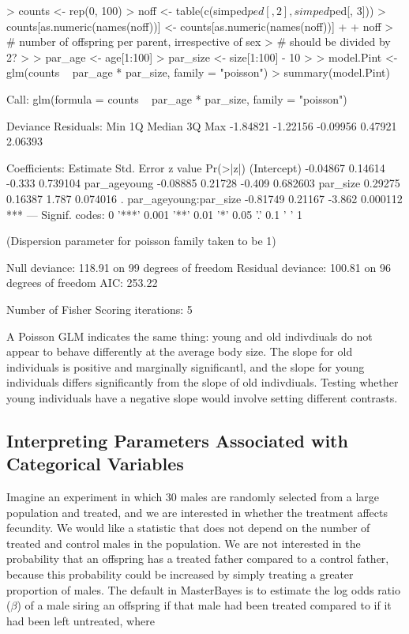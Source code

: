 \documentclass{article}
\begin{document}
\begin{Schunk}
\begin{Sinput}
> counts <- rep(0, 100)
> noff <- table(c(simped$ped[, 2], simped$ped[, 3]))
> counts[as.numeric(names(noff))] <- counts[as.numeric(names(noff))] + 
+     noff
> # number of offspring per parent, irrespective of sex
> # should be divided by 2?
>
> par_age <- age[1:100]
> par_size <- size[1:100] - 10
>
> model.Pint <- glm(counts ~ par_age * par_size, family = "poisson")
> summary(model.Pint)
\end{Sinput}
\begin{Soutput}
Call:
glm(formula = counts ~ par_age * par_size, family = "poisson")

Deviance Residuals: 
     Min        1Q    Median        3Q       Max  
-1.84821  -1.22156  -0.09956   0.47921   2.06393  

Coefficients:
                      Estimate Std. Error z value Pr(>|z|)    
(Intercept)           -0.04867    0.14614  -0.333 0.739104    
par_ageyoung          -0.08885    0.21728  -0.409 0.682603    
par_size               0.29275    0.16387   1.787 0.074016 .  
par_ageyoung:par_size -0.81749    0.21167  -3.862 0.000112 ***
---
Signif. codes:  0 '***' 0.001 '**' 0.01 '*' 0.05 '.' 0.1 ' ' 1 

(Dispersion parameter for poisson family taken to be 1)

    Null deviance: 118.91  on 99  degrees of freedom
Residual deviance: 100.81  on 96  degrees of freedom
AIC: 253.22

Number of Fisher Scoring iterations: 5
\end{Soutput}
\end{Schunk}

A Poisson GLM indicates the same thing: young and old indivdiuals do not appear to behave differently at the average body size.  The slope for old individuals is positive and marginally significantl, and the slope for young individuals differs significantly from the slope of old indivdiuals. Testing whether young individuals have a negative slope would involve setting different contrasts. 

\subsection{Interpreting Parameters Associated with Categorical Variables}

Imagine an experiment in which 30 males are randomly selected from a large population and treated, and we are interested in whether the treatment affects fecundity.  We would like a statistic that does not depend on the number of treated and control males in the population.  We are not interested in the probability that an offspring has a treated father compared to a control father, because this probability could be increased by simply treating a greater proportion of males.  The default in MasterBayes is to estimate the log odds ratio ($\beta$) of a male siring an offspring if that male had been treated compared to if it had been left untreated, where
\end{document}
